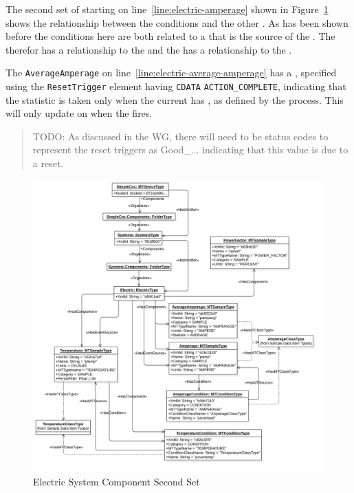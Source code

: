 The second set of  starting on line~\ref{line:electric-amperage} shown in Figure~\ref{fig:electric-system-2} shows the relationship between the conditions and the other . As has been shown before the conditions here are both related to a  that is the source of the . The  therefor has a  relationship to the  and the  has a  relationship to the . 

The \texttt{AverageAmperage} on line~\ref{line:electric-average-amperage} has a , specified using the \texttt{ResetTrigger} element having \texttt{CDATA} \texttt{ACTION_COMPLETE}, indicating that the  statistic is taken only when the current  has , as defined by the process. This  will only update on when the  fires.

\begin{quote}
  {\color{red} TODO: As discussed in the WG, there will need to be status codes to represent the reset triggers as Good_... indicating that this value is due to a reset}.
\end{quote}

\begin{figure}[ht]
  \centering
  \includegraphics[width=1.0\textwidth]{diagrams/mtconnect-mapping/electric-system-2.png}
  \caption{Electric System Component Second Set}
  \label{fig:electric-system-2}
\end{figure}

